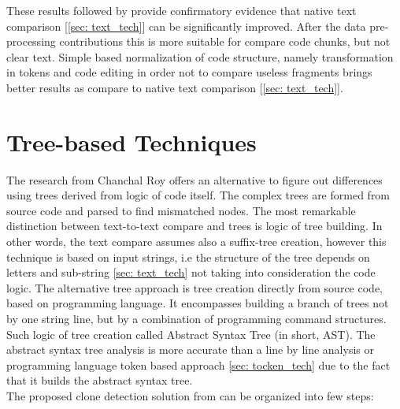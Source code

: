 \documentclass{report}
\begin{document}
These results followed by \cite{tocken_kamiya} provide confirmatory evidence that native text comparison [\ref{sec: text_tech}] can be significantly improved. After the data pre-processing contributions this is more suitable for compare code chunks, but not clear text. Simple based normalization of code structure, namely transformation in tokens and code editing in order not to compare useless fragments brings better results as compare to native text comparison [\ref{sec: text_tech}]. 


\section{Tree-based Techniques}
\label{sec: tree_tech}
The research from Chanchal Roy \cite{software_clone_detection} offers an alternative to figure out differences using trees derived from logic of code itself. The complex trees are formed from source code and parsed to find mismatched nodes. The most remarkable distinction between text-to-text compare and trees is logic of tree building. In other words, the text compare assumes also a suffix-tree creation, however this technique is based on input strings, i.e the structure of the tree depends on letters and sub-string \ref{sec: text_tech} not taking into consideration the code logic. The alternative tree approach is tree creation directly from source code, based on programming language. It encompasses building a branch of trees not by one string line, but by a combination of programming command structures. Such logic of tree creation called Abstract Syntax Tree (in short, AST). The abstract syntax tree analysis is more accurate than a line by line analysis or programming language token based approach \ref{sec: tocken_tech} due to the fact that it builds the abstract syntax tree.\\
The proposed clone detection solution from \cite{flavius} can be organized into few steps:
\end{document}
